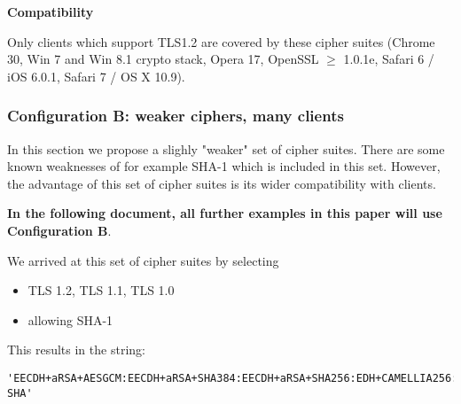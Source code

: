 \textbf{Compatibility}

Only clients which support TLS1.2 are covered by these cipher suites (Chrome 30,
Win 7 and Win 8.1 crypto stack, Opera 17, OpenSSL $\ge$ 1.0.1e, Safari 6 / iOS
6.0.1, Safari 7 / OS X 10.9).



\subsubsection{Configuration B: weaker ciphers, many clients}

In this section we propose a slighly "weaker" set of cipher suites. There are
some known weaknesses of for example SHA-1 which is included in this set.
However, the advantage of this set of cipher suites is its wider compatibility
with clients. 


\textbf{In the following document, all further examples in this paper will use Configuration B}.


We arrived at this set of cipher suites by selecting

\begin{itemize}
\item TLS 1.2, TLS 1.1, TLS 1.0
\item allowing SHA-1

\end{itemize}

This results in the string:

\begin{lstlisting}[breaklines]
'EECDH+aRSA+AESGCM:EECDH+aRSA+SHA384:EECDH+aRSA+SHA256:EDH+CAMELLIA256:EECDH:EDH+aRSA:+SSLv3:!aNULL:!eNULL:!LOW:!3DES:!MD5:!EXP:!PSK:!SRP:!DSS:!RC4:!SEED:!AES128:!CAMELLIA128:!ECDSA:AES256-SHA'
\end{lstlisting}



